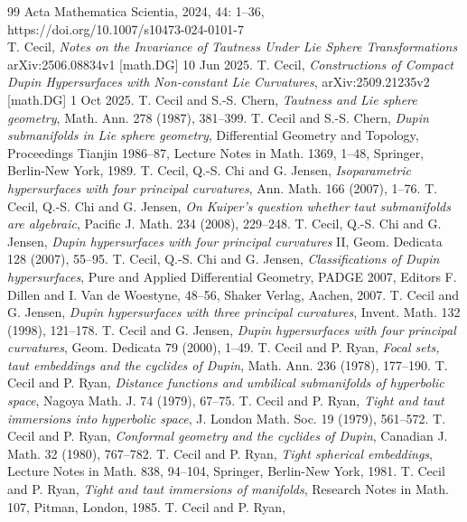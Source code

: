 \documentclass[12pt]{article}
\begin{document}
{\begin{thebibliography}{99}
Acta Mathematica Scientia, 2024, 44: 1--36,\\
https://doi.org/10.1007/s10473-024-0101-7\\
T. Cecil, 
{\em Notes on the Invariance of Tautness Under Lie Sphere Transformations} arXiv:2506.08834v1 [math.DG]
10 Jun 2025.
 T. Cecil,  {\em  Constructions of Compact Dupin Hypersurfaces with Non-constant Lie Curvatures},
arXiv:2509.21235v2 [math.DG] 1 Oct 2025. 
 T. Cecil and S.-S. Chern, {\em Tautness and
Lie sphere geometry}, Math. Ann. 278 (1987), 381--399.
 T. Cecil and S.-S. Chern,
{\em Dupin submanifolds in Lie sphere
geometry}, Differential Geometry and Topology, Proceedings
Tianjin 1986--87, Lecture Notes in Math. 1369, 1--48,
Springer, Berlin-New York, 1989.
 T. Cecil, Q.-S. Chi and G. Jensen,
{\em Isoparametric hypersurfaces with four principal 
curvatures}, Ann. Math. 166 (2007), 1--76.
 T. Cecil, Q.-S. Chi and G. Jensen, 
{\em On Kuiper's question whether taut submanifolds are algebraic},
Pacific J. Math. 234 (2008), 229--248.
 T. Cecil, Q.-S. Chi and G. Jensen, {\em Dupin 
hypersurfaces with four principal curvatures} II, 
Geom. Dedicata 128 (2007), 55--95.
 T. Cecil, Q.-S. Chi and G. Jensen, {\em Classifications of Dupin hypersurfaces}, 
Pure and Applied Differential Geometry, PADGE 2007, Editors F. Dillen and I. Van de Woestyne, 48--56,
Shaker Verlag, Aachen, 2007.
 T. Cecil and G. Jensen, {\em Dupin 
hypersurfaces with three principal curvatures}, 
Invent. Math. 132 (1998), 121--178.
 T. Cecil and G. Jensen, {\em Dupin 
hypersurfaces with four principal curvatures}, 
Geom. Dedicata 79 (2000), 1--49.
 T. Cecil and P. Ryan, {\em Focal sets, taut
embeddings and the cyclides of Dupin}, Math. Ann. 236 (1978),
177--190.
 T. Cecil and P. Ryan, {\em Distance functions
and umbilical submanifolds of hyperbolic space}, Nagoya Math. J. 74
(1979), 67--75.
 T. Cecil and P. Ryan, {\em Tight and taut
immersions into hyperbolic space}, J. London Math. Soc. 19
(1979), 561--572.
 T. Cecil and P. Ryan, {\em Conformal
geometry and the cyclides of Dupin}, Canadian J. Math.
32 (1980), 767--782.
 T. Cecil and P. Ryan, {\em Tight
spherical embeddings}, Lecture Notes in Math. 838, 94--104,
Springer, Berlin-New York, 1981.
 T. Cecil and P. Ryan,
{\em Tight and taut immersions
of manifolds}, Research Notes in Math. 107, Pitman,
London, 1985.
 T. Cecil and P. Ryan,

\end{thebibliography}}
\end{document}
